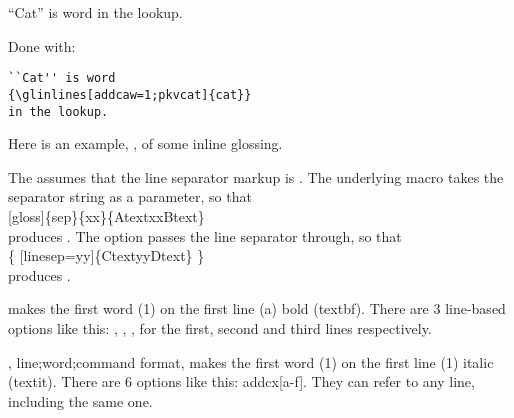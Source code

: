 \documentclass{article}
\begin{document}

``Cat'' is word {} in the lookup.

Done with:

\begin{verbatim}
``Cat'' is word
{\glinlines[addcaw=1;pkvcat]{cat}}
in the lookup.
\end{verbatim}

Here is an example, 
,
of some inline glossing.




 The  assumes that the line separator markup is \glmeta{*/}. The underlying macro  takes the separator string as a parameter, so that\\
 [gloss]\{sep\}\{xx\}\{AtextxxBtext\}\\ 
 produces .
The  option passes the line separator through, so that\\
\{ [linesep=yy]\{CtextyyDtext\} \}\\ 
 produces {}.








\begin{exe}
\ex  {}
\end{exe}


 makes the first word (1) on the first line (a) bold (textbf). There are 3 line-based options like this:
, , , for the first, second and third lines respectively.

, line;word;command format, makes the first word (1) on the first line (1) italic (textit). There are 6 options like this: addcx[a-f]. They can refer to any line, including the same one.
\end{document}
